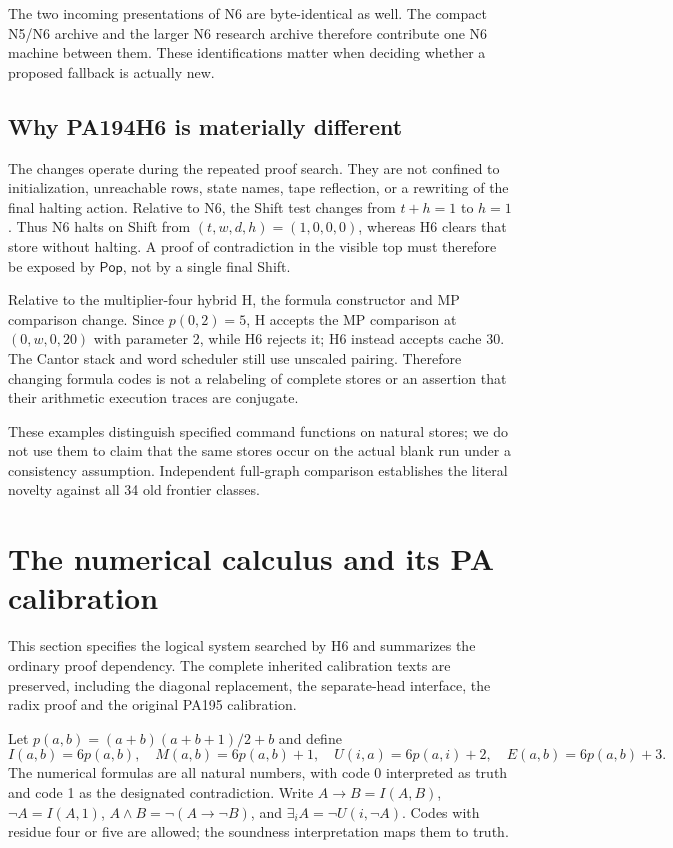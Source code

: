 \documentclass[11pt,letterpaper]{article}
\begin{document}
The two incoming presentations of N6 are byte-identical as well. The compact
N5/N6 archive and the larger N6 research archive therefore contribute one
N6 machine between them. These identifications matter when deciding whether
a proposed fallback is actually new.

\subsection{Why PA194H6 is materially different}

The changes operate during the repeated proof search. They are not confined
to initialization, unreachable rows, state names, tape reflection, or a
rewriting of the final halting action. Relative to N6, the Shift test changes
from \(t+h=1\) to \(h=1\). Thus N6 halts on Shift from
\((t,w,d,h)=(1,0,0,0)\), whereas H6 clears that store without halting.
A proof of contradiction in the visible top must therefore be exposed by
\(\mathsf{Pop}\), not by a single final Shift.

Relative to the multiplier-four hybrid H, the formula constructor and MP
comparison change. Since \(p(0,2)=5\), H accepts the MP comparison at
\((0,w,0,20)\) with parameter 2, while H6 rejects it; H6 instead accepts
cache 30. The Cantor stack and word scheduler still use unscaled pairing.
Therefore changing formula codes is not a relabeling of complete stores or
an assertion that their arithmetic execution traces are conjugate.

These examples distinguish specified command functions on natural stores;
we do not use them to claim that the same stores occur on the actual blank
run under a consistency assumption. Independent full-graph comparison
establishes the literal novelty against all 34 old frontier classes.

\section{The numerical calculus and its PA calibration}
\label{sec:logic}

This section specifies the logical system searched by H6 and summarizes the
ordinary proof dependency. The complete inherited calibration texts are
preserved, including the diagonal replacement, the separate-head interface,
the radix proof and the original PA195 calibration.

Let \(p(a,b)=(a+b)(a+b+1)/2+b\) and define
\[
 I(a,b)=6p(a,b),\quad M(a,b)=6p(a,b)+1,\quad
 U(i,a)=6p(a,i)+2,\quad E(a,b)=6p(a,b)+3.
\]
The numerical formulas are all natural numbers, with code 0 interpreted as
truth and code 1 as the designated contradiction. Write \(A\to B=I(A,B)\),
\(\neg A=I(A,1)\), \(A\wedge B=\neg(A\to\neg B)\), and
\(\exists_i A=\neg U(i,\neg A)\). Codes with residue four or five are allowed;
the soundness interpretation maps them to truth.
\end{document}
